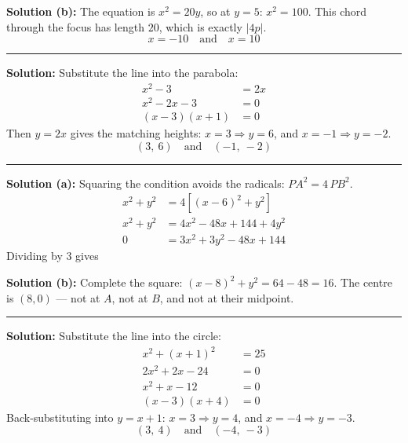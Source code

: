 \documentclass[12pt]{article}
\begin{document}
\textbf{Solution (b):} The equation is $x^{2} = 20y$, so at $y = 5$: $x^{2} = 100$. This chord through the focus has length $20$, which is exactly $|4p|$.
\[ \boxed{x = -10 \quad \text{and} \quad x = 10} \]

\vspace{0.1cm}\noindent\rule{\linewidth}{0.2pt}


\textbf{Solution:} Substitute the line into the parabola:
\begin{align*}
  x^{2} - 3 &= 2x \\
  x^{2} - 2x - 3 &= 0 \\
  (x - 3)(x + 1) &= 0
\end{align*}
Then $y = 2x$ gives the matching heights: $x = 3 \Rightarrow y = 6$, and $x = -1 \Rightarrow y = -2$.
\[ \boxed{(3,\ 6) \quad \text{and} \quad (-1,\ -2)} \]

\vspace{0.1cm}\noindent\rule{\linewidth}{0.2pt}


\textbf{Solution (a):} Squaring the condition avoids the radicals: $PA^{2} = 4\,PB^{2}$.
\begin{align*}
  x^{2} + y^{2} &= 4\left[(x-6)^{2} + y^{2}\right] \\
  x^{2} + y^{2} &= 4x^{2} - 48x + 144 + 4y^{2} \\
  0 &= 3x^{2} + 3y^{2} - 48x + 144
\end{align*}
Dividing by $3$ gives 

\textbf{Solution (b):} Complete the square: $(x - 8)^{2} + y^{2} = 64 - 48 = 16$. The centre is $(8, 0)$ --- not at $A$, not at $B$, and not at their midpoint. 

\vspace{0.1cm}\noindent\rule{\linewidth}{0.2pt}


\textbf{Solution:} Substitute the line into the circle:
\begin{align*}
  x^{2} + (x + 1)^{2} &= 25 \\
  2x^{2} + 2x - 24 &= 0 \\
  x^{2} + x - 12 &= 0 \\
  (x - 3)(x + 4) &= 0
\end{align*}
Back-substituting into $y = x + 1$: $x = 3 \Rightarrow y = 4$, and $x = -4 \Rightarrow y = -3$.
\[ \boxed{(3,\ 4) \quad \text{and} \quad (-4,\ -3)} \]
\end{document}
